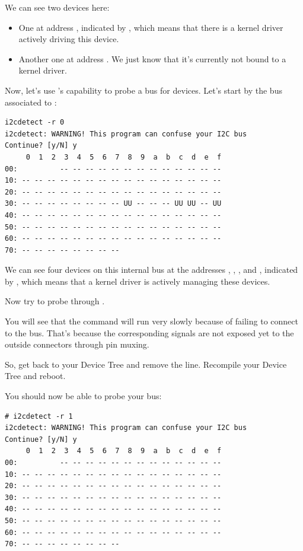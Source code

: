 We can see two devices here:
\begin{itemize}
\item One at address , indicated by , which means
  that there is a kernel driver actively driving this device.
\item Another one at address . We just know that it's
  currently not bound to a kernel driver.
\end{itemize}
\fi
\if{}
Now, let's use 's capability to probe a bus for devices.
Let's start by the bus associated to :

\begin{verbatim}
i2cdetect -r 0
i2cdetect: WARNING! This program can confuse your I2C bus
Continue? [y/N] y
     0  1  2  3  4  5  6  7  8  9  a  b  c  d  e  f
00:          -- -- -- -- -- -- -- -- -- -- -- -- --
10: -- -- -- -- -- -- -- -- -- -- -- -- -- -- -- --
20: -- -- -- -- -- -- -- -- -- -- -- -- -- -- -- --
30: -- -- -- -- -- -- -- -- UU -- -- -- UU UU -- UU
40: -- -- -- -- -- -- -- -- -- -- -- -- -- -- -- --
50: -- -- -- -- -- -- -- -- -- -- -- -- -- -- -- --
60: -- -- -- -- -- -- -- -- -- -- -- -- -- -- -- --
70: -- -- -- -- -- -- -- --
\end{verbatim}

We can see four devices on this internal bus at the addresses
, , , and , indicated by
, which means that a kernel driver is actively managing these
devices.
\fi

Now try to probe \busname through .

You will see that the command will run very slowly because of failing to
connect to the bus. That's because the corresponding signals are
not exposed yet to the outside connectors through pin muxing.

So, get back to your Device Tree and remove the 
line. Recompile your Device Tree and reboot.

You should now be able to probe your bus:

\begin{verbatim}
# i2cdetect -r 1
i2cdetect: WARNING! This program can confuse your I2C bus
Continue? [y/N] y
     0  1  2  3  4  5  6  7  8  9  a  b  c  d  e  f
00:          -- -- -- -- -- -- -- -- -- -- -- -- --
10: -- -- -- -- -- -- -- -- -- -- -- -- -- -- -- --
20: -- -- -- -- -- -- -- -- -- -- -- -- -- -- -- --
30: -- -- -- -- -- -- -- -- -- -- -- -- -- -- -- --
40: -- -- -- -- -- -- -- -- -- -- -- -- -- -- -- --
50: -- -- -- -- -- -- -- -- -- -- -- -- -- -- -- --
60: -- -- -- -- -- -- -- -- -- -- -- -- -- -- -- --
70: -- -- -- -- -- -- -- --
\end{verbatim}

